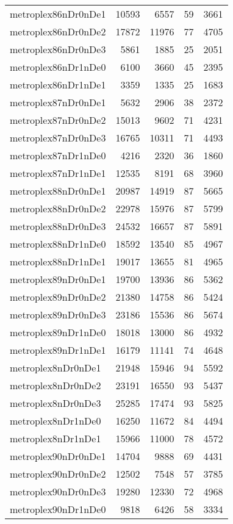 \begin{tabular}{lrrrr}
metroplex86nDr0nDe1 & 10593 & 6557 & 59 & 3661 \\
metroplex86nDr0nDe2 & 17872 & 11976 & 77 & 4705 \\
metroplex86nDr0nDe3 & 5861 & 1885 & 25 & 2051 \\
metroplex86nDr1nDe0 & 6100 & 3660 & 45 & 2395 \\
metroplex86nDr1nDe1 & 3359 & 1335 & 25 & 1683 \\
metroplex87nDr0nDe1 & 5632 & 2906 & 38 & 2372 \\
metroplex87nDr0nDe2 & 15013 & 9602 & 71 & 4231 \\
metroplex87nDr0nDe3 & 16765 & 10311 & 71 & 4493 \\
metroplex87nDr1nDe0 & 4216 & 2320 & 36 & 1860 \\
metroplex87nDr1nDe1 & 12535 & 8191 & 68 & 3960 \\
metroplex88nDr0nDe1 & 20987 & 14919 & 87 & 5665 \\
metroplex88nDr0nDe2 & 22978 & 15976 & 87 & 5799 \\
metroplex88nDr0nDe3 & 24532 & 16657 & 87 & 5891 \\
metroplex88nDr1nDe0 & 18592 & 13540 & 85 & 4967 \\
metroplex88nDr1nDe1 & 19017 & 13655 & 81 & 4965 \\
metroplex89nDr0nDe1 & 19700 & 13936 & 86 & 5362 \\
metroplex89nDr0nDe2 & 21380 & 14758 & 86 & 5424 \\
metroplex89nDr0nDe3 & 23186 & 15536 & 86 & 5674 \\
metroplex89nDr1nDe0 & 18018 & 13000 & 86 & 4932 \\
metroplex89nDr1nDe1 & 16179 & 11141 & 74 & 4648 \\
metroplex8nDr0nDe1 & 21948 & 15946 & 94 & 5592 \\
metroplex8nDr0nDe2 & 23191 & 16550 & 93 & 5437 \\
metroplex8nDr0nDe3 & 25285 & 17474 & 93 & 5825 \\
metroplex8nDr1nDe0 & 16250 & 11672 & 84 & 4494 \\
metroplex8nDr1nDe1 & 15966 & 11000 & 78 & 4572 \\
metroplex90nDr0nDe1 & 14704 & 9888 & 69 & 4431 \\
metroplex90nDr0nDe2 & 12502 & 7548 & 57 & 3785 \\
metroplex90nDr0nDe3 & 19280 & 12330 & 72 & 4968 \\
metroplex90nDr1nDe0 & 9818 & 6426 & 58 & 3334 \\

\end{tabular}
